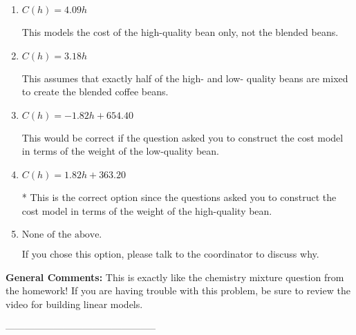 \documentclass{article}[14pt]
\begin{document}
\begin{enumerate}[label=\Alph*.] 
\item $ C(h) = 4.09 h $ 

 This models the cost of the high-quality bean only, not the blended beans. 
\item $ C(h) = 3.18 h $ 

 This assumes that exactly half of the high- and low- quality beans are mixed to create the blended coffee beans. 
\item $ C(h) = -1.82 h + 654.40 $ 

 This would be correct if the question asked you to construct the cost model in terms of the weight of the low-quality bean. 
\item $ C(h) = 1.82 h + 363.20 $ 

 * This is the correct option since the questions asked you to construct the cost model in terms of the weight of the high-quality bean. 
\item $ \text{None of the above.} $ 

 If you chose this option, please talk to the coordinator to discuss why. 
\end{enumerate} 
 
\textbf{General Comments:} This is exactly like the chemistry mixture question from the homework! If you are having trouble with this problem, be sure to review the video for building linear models.

-----------------------------------------------
\end{document}
